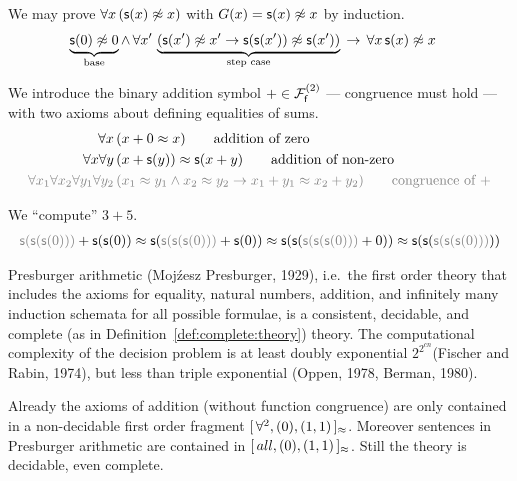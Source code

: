 \begin{example}
	We may prove \( \forall x\, (\msucc(x) \mNE x) \) with \( G(x) = \msucc(x) \mNE x \) by induction.
	\begin{align*}
		\underbrace{\msucc(0)\mNE 0}_{\text{base}}
		\land \, \forall x' \, &
		\underbrace{
			\left( \msucc(x')\mNE x' \limp \msucc(\msucc(x'))\mNE \msucc(x') \right)
		}_{\text{step case}}
		\, \limp \, \forall x \, \msucc(x)\mNE x
		\end{align*}
\end{example}

\begin{definition}
	[Addition]\label{def:addition:axioms}
	We introduce the binary addition symbol \( +\in\mcFfn[2] \)
	--- congruence must hold ---
	with two axioms about defining equalities of sums.
\begin{align*}
\forall x\,
&(x+0 \mEQ x)
\tag*{addition of zero}\\
\forall x\forall y\,
&(x+\msucc(y)) \mEQ \msucc(x+y)
\tag*{addition of non-zero}
\\
\colG\forall x_1\forall x_2\forall y_1\forall y_2\,
&\colG (x_1\mEQ y_1\land x_2\mEQ y_2 \limp x_1+y_1\mEQ x_2+y_2)
\tag*{congruence of \( + \)}
\end{align*}
\end{definition}

\begin{example}
	We “compute” \( 3 + 5 \).
	\begin{gather*}
	{\colG \msucc(\msucc(\msucc(0)))} + \msucc(\msucc(0))
	\mEQ\msucc({\colG \msucc(\msucc(\msucc(0)))} + \msucc(0))
	\mEQ \msucc(\msucc(
	{\colG \msucc(\msucc(\msucc(0)))} + 0))
	\mEQ \msucc(\msucc(
	{\colG \msucc(\msucc(\msucc(0)))}))
	\end{gather*}
\end{example}

\begin{theorem}Presburger arithmetic (Moj\'{z}esz Presburger, 1929), i.e.\ the first order theory that includes the axioms for equality, natural numbers, addition, and 
	infinitely many induction schemata for all possible formulae, is a consistent, decidable, and complete (as in Definition~\vref{def:complete:theory}) theory. 
	The computational complexity of the decision problem is at least doubly exponential \( 2^{2^{cn}} \)(Fischer and Rabin, 1974), but less than triple exponential (Oppen, 1978, Berman, 1980).
\end{theorem}

\begin{remark}
	Already the axioms of addition (without function congruence)
	are only contained in a non-decidable first order fragment
	\( [ \, \forall^2 , (0), (1,1) \, ]{}_{\mEQ} \). Moreover
	sentences in Presburger arithmetic are contained in
	\( [ \, all , (0), (1,1) \, ]{}_{\mEQ} \).
	Still the theory is decidable, even complete.
\end{remark}

